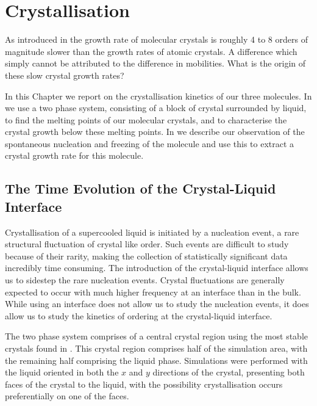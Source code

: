 \chapter{Crystallisation}

As introduced in  the growth rate of molecular crystals is roughly 4 to 8 orders of magnitude slower than the growth rates of atomic crystals. A difference which simply cannot be attributed to the difference in mobilities. What is the origin of these slow crystal growth rates?

In this Chapter we report on the crystallisation kinetics of our three molecules. In  we use a two phase system, consisting of a block of crystal surrounded by liquid, to find the melting points of our molecular crystals, and to characterise the crystal growth below these melting points. In  we describe our observation of the spontaneous nucleation and freezing of the \done molecule and use this to extract a crystal growth rate for this molecule.

\section{The Time Evolution of the Crystal-Liquid Interface}
\label{sec:two phase}

Crystallisation of a supercooled liquid is initiated by a nucleation event, a rare structural fluctuation of crystal like order. Such events are difficult to study because of their rarity, making the collection of statistically significant data incredibly time consuming. The introduction of the crystal-liquid interface allows us to sidestep the rare nucleation events. Crystal fluctuations are generally expected to occur with much higher frequency at an interface than in the bulk. While using an interface does not allow us to study the nucleation events, it does allow us to study the kinetics of ordering at the crystal-liquid interface.

The two phase system comprises of a central crystal region using the most stable crystals found in . This crystal region comprises half of the simulation area, with the remaining half comprising the liquid phase. Simulations were performed with the liquid oriented in both the $x$ and $y$ directions of the crystal, presenting both faces of the crystal to the liquid, with the possibility crystallisation occurs preferentially on one of the faces.

